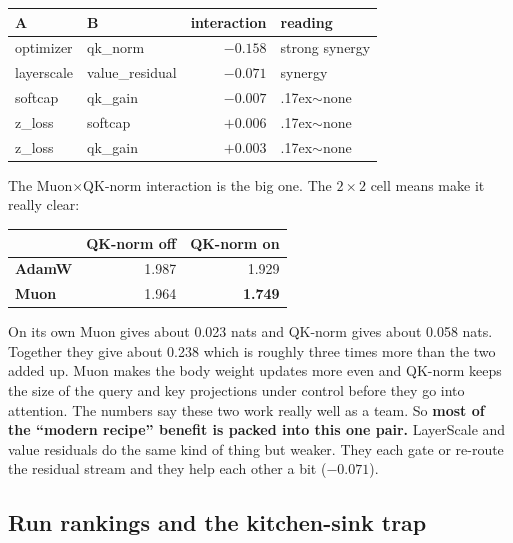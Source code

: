\documentclass[11pt]{article}
\begin{document}
\begin{table}[h]
\centering
\small
\begin{tabular}{@{}llRl@{}}
\toprule
\textbf{A} & \textbf{B} & \textbf{interaction} & \textbf{reading} \\
\midrule
optimizer  & qk\_norm        & $-0.158$ & strong synergy \\
layerscale & value\_residual & $-0.071$ & synergy \\
softcap    & qk\_gain        & $-0.007$ & {\raise.17ex\hbox{$\scriptstyle\sim$}}none \\
z\_loss    & softcap         & $+0.006$ & {\raise.17ex\hbox{$\scriptstyle\sim$}}none \\
z\_loss    & qk\_gain        & $+0.003$ & {\raise.17ex\hbox{$\scriptstyle\sim$}}none \\
\bottomrule
\end{tabular}
\end{table}

The Muon$\times$QK-norm interaction is the big one. The $2\times2$ cell means make
it really clear:

\begin{table}[h]
\centering
\small
\begin{tabular}{@{}lRR@{}}
\toprule
 & \textbf{QK-norm off} & \textbf{QK-norm on} \\
\midrule
\textbf{AdamW} & 1.987 & 1.929 \\
\textbf{Muon}  & 1.964 & \textbf{1.749} \\
\bottomrule
\end{tabular}
\end{table}

On its own Muon gives about 0.023 nats and QK-norm gives about 0.058 nats.
Together they give about 0.238 which is roughly three times more than the two
added up. Muon makes the body weight updates more even and QK-norm keeps the size
of the query and key projections under control before they go into attention. The
numbers say these two work really well as a team. So \textbf{most of the ``modern
recipe'' benefit is packed into this one pair.} LayerScale and value residuals do
the same kind of thing but weaker. They each gate or re-route the residual stream
and they help each other a bit ($-0.071$).

\subsection{Run rankings and the kitchen-sink trap}
\end{document}
